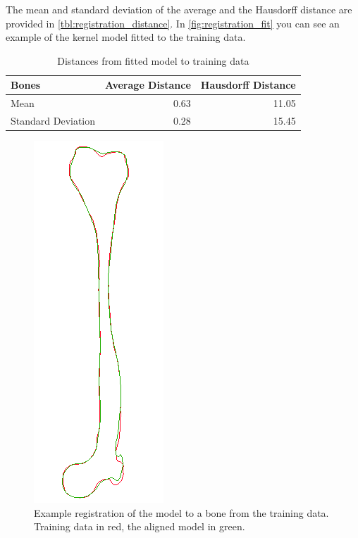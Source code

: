 The mean and standard deviation of the average and the Hausdorff distance are provided in \autoref{tbl:registration_distance}.
In \autoref{fig:registration_fit} you can see an example of the kernel model fitted to the training data.

\begin{table}
  \centering
  \caption{Distances from fitted model to training data}
  \label{tbl:registration_distance}
  \begin{tabular}{lrr}
    \toprule
      \textbf{Bones} &
      Average Distance &
      Hausdorff Distance \\
    \midrule
      Mean& 0.63 & 11.05 \\
      Standard Deviation& 0.28 & 15.45 \\
    \bottomrule
  \end{tabular}
\end{table}

\begin{figure}
	\centering
  \includegraphics[scale=0.7]{./Figures/registration_fit}
  \caption{Example registration of the model to a bone from the training data. Training data in red, the aligned model in green.}
  \label{fig:registration_fit}
\end{figure}


